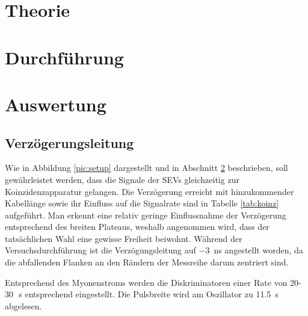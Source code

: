 

\section{Theorie}

\section{Durchführung}
\label{sec:exec}

\section{Auswertung}
\subsection{Verzögerungsleitung}
Wie in Abbildung \ref{pic:setup} dargestellt und in Abschnitt \ref{sec:exec} beschrieben, soll gewährleistet werden, dass die Signale der SEVs 
gleichzeitig zur Koinzidenzapparatur gelangen. Die Verzögerung erreicht mit hinzukommender Kabellänge sowie ihr Einfluss auf die Signalrate
sind in Tabelle \ref{tab:koinz} aufgeführt. Man erkennt eine relativ geringe Einflussnahme der Verzögerung entsprechend des breiten Plateaus,
weshalb angenommen wird, dass der tatsächlichen Wahl eine gewisse Freiheit beiwohnt. 
Während der Versuchsdurchführung ist die Verzögungsleitung auf \SI{-3}{\nano\second} angestellt worden, da die abfallenden Flanken an den 
Rändern der Messreihe darum zentriert sind. 
\begin{table}[b]

\caption{Verzögerungsleitung zur Synchronisierung der SEVs. Negative $t$ entsprechen einer Verzögerung des linken SEVs. In der dritten Spalte 
sind die Zählraten auf 10\,s Messzeit aufgeführt.}
\label{tab:koinz}
\end{table}
Entsprechend des Myonenstroms \cite{pdg} werden die Diskriminatoren einer Rate von 20-30\,\si{\per\second} entsprechend eingestellt. Die 
Pulsbreite wird am Oszillator zu \SI{11,5}{\s} abgelesen.
